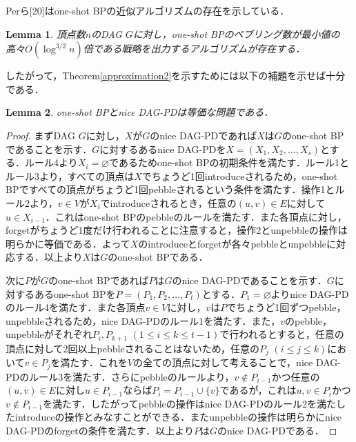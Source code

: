 \documentclass[master]{kuisthesis}		%
\theoremstyle{plain}
\newtheorem{lemma}{Lemma}
\theoremstyle{definition}
\begin{document}
Perら[20]はone-shot BPの近似アルゴリズムの存在を示している．

\begin{lemma}
    頂点数$n$のDAG $G$に対し，one-shot BPのペブリング数が最小値の高々$O(\log ^{3/2} n)$倍である戦略を出力するアルゴリズムが存在する．
\end{lemma}

したがって，Theorem\ref{approximation2}を示すためには以下の補題を示せば十分である．

\begin{lemma}\label{lemma_approximation2}
    one-shot BPとnice DAG-PDは等価な問題である．
\end{lemma}

\begin{proof}
    まずDAG $G$に対し，$X$が$G$のnice DAG-PDであれば$X$は$G$のone-shot BPであることを示す．$G$に対するあるnice DAG-PDを$X=(X_1, X_2, \dots, X_s)$とする．ルール4より$X_i = \varnothing$であるためone-shot BPの初期条件を満たす．ルール1とルール3より，すべての頂点は$X$でちょうど1回introduceされるため，one-shot BPですべての頂点がちょうど1回pebbleされるという条件を満たす．操作1とルール2より，$v \in V$が$X_i$でintroduceされるとき，任意の$(u, v)\in E$に対して$u \in X_{i-1}$．これはone-shot BPのpebbleのルールを満たす．また各頂点に対し，forgetがちょうど1度だけ行われることに注意すると，操作2とunpebbleの操作は明らかに等価である．よって$X$のintroduceとforgetが各々pebbleとunpebbleに対応する．以上より$X$は$G$のone-shot BPである．
    
    次に$P$が$G$のone-shot BPであれば$P$は$G$のnice DAG-PDであることを示す．$G$に対するあるone-shot BPを$P=(P_1, P_2, \dots, P_t)$とする．$P_1 = \varnothing$よりnice DAG-PDのルール4を満たす．また各頂点$v \in V$に対し，$v$は$P$でちょうど1回ずつpebble，unpebbleされるため，nice DAG-PDのルール1を満たす．また，$v$のpebble，unpebbleがそれぞれ$P_i, P_{k+1}$ $(1 \leq i \leq k \leq t-1)$で行われるとすると，任意の頂点に対して2回以上pebbleされることはないため，任意の$P_j$ $(i \leq j \leq k)$において$v \in P_j$を満たす．これを$V$の全ての頂点に対して考えることで，nice DAG-PDのルール3を満たす．さらにpebbleのルールより，$v \notin P_{i-1}$かつ任意の$(u, v) \in E$に対し$u \in P_{i-1}$ならば$P_i = P_{i-1} \cup \{v\}$であるが，これは$u, v \in P_i$かつ$v \notin P_{i-1}$を満たす．したがってpebbleの操作はnice DAG-PDのルール2を満たしたintroduceの操作とみなすことができる．またunpebbleの操作は明らかにnice DAG-PDのforgetの条件を満たす．以上より$P$は$G$のnice DAG-PDである．
\end{proof}
\end{document}
